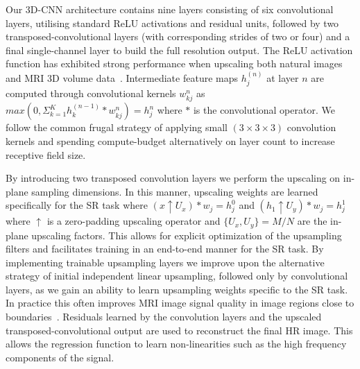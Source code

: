 \documentclass[runningheads,a4paper]{llncs}
\begin{document}
Our 3D-CNN architecture contains nine layers consisting of six convolutional layers, utilising standard ReLU activations and residual units, followed by two transposed-convolutional layers (with corresponding strides of two or four) and a final single-channel layer to build the full resolution output. %
The ReLU activation function has exhibited strong performance when upscaling both natural images~\cite{Dong2016a} and MRI 3D volume data~\cite{Oktay2016}. Intermediate feature maps $h^{(n)}_j$ at layer $n$ are computed through convolutional kernels $w^n_{kj}$ as $max(0 , \Sigma^K_{k=1} h_k^{(n-1)} \ast w^n_{kj}) = h^n_j$ where $\ast$ is the convolutional operator. We follow the common frugal strategy \cite{Simonyan2014} of applying small $(3\times3\times3)$ convolution kernels and spending compute-budget alternatively on layer count to increase receptive field size. 

By introducing two transposed convolution layers we perform the upscaling on in-plane sampling dimensions. In this manner, upscaling weights are learned specifically for the SR task where $(x \uparrow U_x) * w_j = h_j^0$ and $(h_1 \uparrow U_y) * w_j = h_j^1$ where $\uparrow$ is a zero-padding upscaling operator and $\{U_x,U_y\} = M/N$ are the in-plane upscaling factors. This allows for explicit optimization of the upsampling filters and facilitates training in an end-to-end manner for the SR task. By implementing trainable upsampling layers we improve upon the alternative strategy of initial independent linear upsampling, followed only by convolutional layers, as we gain an ability to learn upsampling weights specific to the SR task. In practice this often improves MRI image signal quality in image regions close to boundaries~\cite{Oktay2016}. Residuals learned by the convolution layers and the upscaled transposed-convolutional output are used to reconstruct the final HR image. This allows the regression function to learn non-linearities such as the high frequency components of the signal.%
\end{document}
